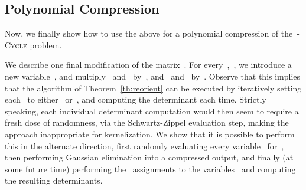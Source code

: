 \documentclass[a4paper,11pt]{article}
\begin{document}
\subsection{Polynomial Compression}

Now, we finally show how to use the above for a polynomial compression of
the~\textsc{-Cycle} problem. 

We describe one final modification of the matrix~. For every~,~, we
introduce a new variable~, and multiply~ and~
by~, and~ and~ by~. Observe that this implies that the
algorithm of Theorem~\ref{th:reorient} can be executed by iteratively setting each~
to either~ or~, and computing the determinant each time. Strictly speaking,
each individual determinant computation would then seem to require a fresh dose of
randomness, via the Schwartz-Zippel evaluation step, making the approach inappropriate for
kernelization. We show that it is possible to perform this in the alternate direction,
first randomly evaluating every variable~ for~, then performing Gaussian
elimination into a compressed output, and finally (at some future time) performing
the~ assignments to the variables~ and computing the resulting
determinants. 
\end{document}

